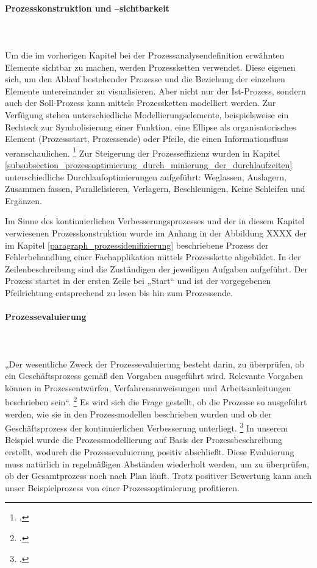 \paragraph{Prozesskonstruktion und –sichtbarkeit}\mbox{}\\\\
\label{paragraph_prozesskonstruktion_und_sichtbarkeit}
Um die im vorherigen Kapitel bei der Prozessanalysendefinition erwähnten Elemente sichtbar zu machen, werden Prozessketten verwendet. Diese eigenen sich, um den Ablauf bestehender Prozesse und die Beziehung der einzelnen Elemente untereinander zu visualisieren. Aber nicht nur der Ist-Prozess, sondern auch der Soll-Prozess kann mittels Prozessketten modelliert werden. Zur Verfügung stehen unterschiedliche Modellierungselemente, beispielsweise ein Rechteck zur Symbolisierung einer Funktion, eine Ellipse als organisatorisches Element (Prozessstart, Prozessende) oder Pfeile, die einen Informationsfluss veranschaulichen. \footcite[Vgl.][64]{krcmar_einfuhrung_2015} Zur Steigerung der Prozesseffizienz wurden in Kapitel \ref{subsubsection_prozessoptimierung_durch_minierung_der_durchlaufzeiten} unterschiedliche Durchlaufoptimierungen aufgeführt: Weglassen, Auslagern, Zusammen fassen, Parallelisieren, Verlagern, Beschleunigen, Keine Schleifen und Ergänzen.

Im Sinne des kontinuierlichen Verbesserungsprozesses und der in diesem Kapitel verwiesenen Prozesskonstruktion wurde im Anhang in der Abbildung XXXX der im Kapitel \ref{paragraph_prozessidenifizierung} beschriebene Prozess der Fehlerbehandlung einer Fachapplikation mittels Prozesskette abgebildet. In der Zeilenbeschreibung sind die Zuständigen der jeweiligen Aufgaben aufgeführt. Der Prozess startet in der ersten Zeile bei „Start“ und ist der vorgegebenen Pfeilrichtung entsprechend zu lesen bis hin zum Prozessende.

\paragraph{Prozessevaluierung}\mbox{}\\\\
„Der wesentliche Zweck der Prozessevaluierung besteht darin, zu überprüfen, ob ein Geschäftsprozess gemäß den Vorgaben ausgeführt wird. Relevante Vorgaben können in Prozessentwürfen, Verfahrensanweisungen und Arbeitsanleitungen beschrieben sein“. \footcite[277]{heinrich_stelzer_2011} Es wird sich die Frage gestellt, ob die Prozesse so ausgeführt werden, wie sie in den Prozessmodellen beschrieben wurden und ob der Geschäftsprozess der kontinuierlichen Verbesserung unterliegt. \footcite[Vgl.][277]{heinrich_stelzer_2011} In unserem Beispiel wurde die Prozessmodellierung auf Basis der Prozessbeschreibung erstellt, wodurch die Prozessevaluierung positiv abschließt. Diese Evaluierung muss natürlich in regelmäßigen Abständen wiederholt werden, um zu überprüfen, ob der Gesamtprozess noch nach Plan läuft. Trotz positiver Bewertung kann auch unser Beispielprozess von einer Prozessoptimierung profitieren.

